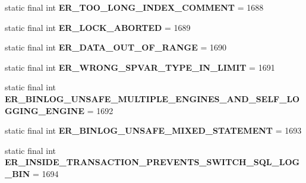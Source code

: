 \begin{DoxyCompactItemize}
static final int {\bfseries E\+R\+\_\+\+T\+O\+O\+\_\+\+L\+O\+N\+G\+\_\+\+I\+N\+D\+E\+X\+\_\+\+C\+O\+M\+M\+E\+NT} = 1688
\item 
\mbox{\label{classcom_1_1mysql_1_1jdbc_1_1_mysql_error_numbers_af94b491538fe0203a7fb579539d10263}} 
static final int {\bfseries E\+R\+\_\+\+L\+O\+C\+K\+\_\+\+A\+B\+O\+R\+T\+ED} = 1689
\item 
\mbox{\label{classcom_1_1mysql_1_1jdbc_1_1_mysql_error_numbers_a441372f1acb3d79956d1cc8655511970}} 
static final int {\bfseries E\+R\+\_\+\+D\+A\+T\+A\+\_\+\+O\+U\+T\+\_\+\+O\+F\+\_\+\+R\+A\+N\+GE} = 1690
\item 
\mbox{\label{classcom_1_1mysql_1_1jdbc_1_1_mysql_error_numbers_a59985480db79f2c2efa429d21b507b8d}} 
static final int {\bfseries E\+R\+\_\+\+W\+R\+O\+N\+G\+\_\+\+S\+P\+V\+A\+R\+\_\+\+T\+Y\+P\+E\+\_\+\+I\+N\+\_\+\+L\+I\+M\+IT} = 1691
\item 
\mbox{\label{classcom_1_1mysql_1_1jdbc_1_1_mysql_error_numbers_ab799d9436bdcda8b90ff8e55c4c66ab2}} 
static final int {\bfseries E\+R\+\_\+\+B\+I\+N\+L\+O\+G\+\_\+\+U\+N\+S\+A\+F\+E\+\_\+\+M\+U\+L\+T\+I\+P\+L\+E\+\_\+\+E\+N\+G\+I\+N\+E\+S\+\_\+\+A\+N\+D\+\_\+\+S\+E\+L\+F\+\_\+\+L\+O\+G\+G\+I\+N\+G\+\_\+\+E\+N\+G\+I\+NE} = 1692
\item 
\mbox{\label{classcom_1_1mysql_1_1jdbc_1_1_mysql_error_numbers_adae4901001455dc0eb689f3954f21c8b}} 
static final int {\bfseries E\+R\+\_\+\+B\+I\+N\+L\+O\+G\+\_\+\+U\+N\+S\+A\+F\+E\+\_\+\+M\+I\+X\+E\+D\+\_\+\+S\+T\+A\+T\+E\+M\+E\+NT} = 1693
\item 
\mbox{\label{classcom_1_1mysql_1_1jdbc_1_1_mysql_error_numbers_af5f076c32bec71def9db8398c46e0c92}} 
static final int {\bfseries E\+R\+\_\+\+I\+N\+S\+I\+D\+E\+\_\+\+T\+R\+A\+N\+S\+A\+C\+T\+I\+O\+N\+\_\+\+P\+R\+E\+V\+E\+N\+T\+S\+\_\+\+S\+W\+I\+T\+C\+H\+\_\+\+S\+Q\+L\+\_\+\+L\+O\+G\+\_\+\+B\+IN} = 1694
\item 
\mbox{\label{classcom_1_1mysql_1_1jdbc_1_1_mysql_error_numbers_acbe22407e2a7ede47da68f656bcc2121}} 

\end{DoxyCompactItemize}
